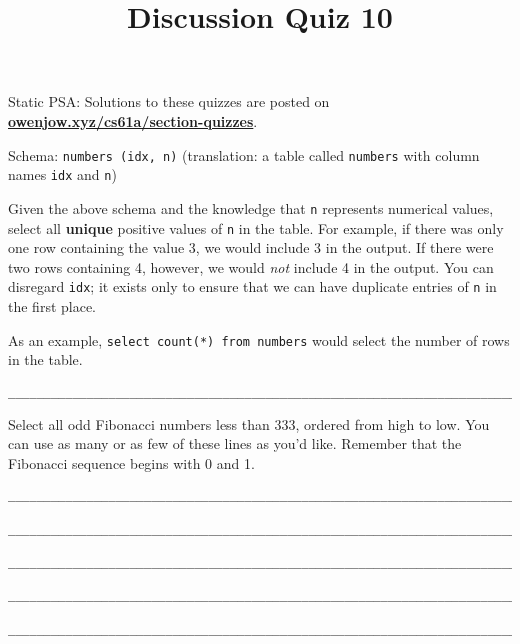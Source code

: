 \documentclass[twoside]{article}
\title{\sc Discussion Quiz 10 \solution{Solutions}}
\begin{document}
\thispagestyle{empty}
\maketitle

\hfill Static PSA: Solutions to these quizzes are posted on \textbf{\href{http://owenjow.xyz/cs61a/section-quizzes}{owenjow.xyz/cs61a/section-quizzes}}.

\begin{enumerate}

Schema: \texttt{numbers (idx, n)} (translation: a table called \texttt{numbers} with column names \texttt{idx} and \texttt{n})

Given the above schema and the knowledge that \texttt{n} represents numerical values, select all \textbf{unique} positive values of \texttt{n} in the table. For example, if there was only one row containing the value 3, we would include 3 in the output. If there were two rows containing 4, however, we would \textit{not} include 4 in the output. You can disregard \texttt{idx}; it exists only to ensure that we can have duplicate entries of \texttt{n} in the first place.

As an example, \texttt{select count(*) from numbers} would select the number of rows in the table.

\begin{verbatim}
___________________________________________________________________________________________
\end{verbatim}


Select all odd Fibonacci numbers less than 333, ordered from high to low. You can use as many or as few of these lines as you'd like. Remember that the Fibonacci sequence begins with 0 and 1.

\begin{verbatim}
___________________________________________________________________________________________

___________________________________________________________________________________________

___________________________________________________________________________________________

___________________________________________________________________________________________

___________________________________________________________________________________________
\end{verbatim}


\end{enumerate}
\end{document}
